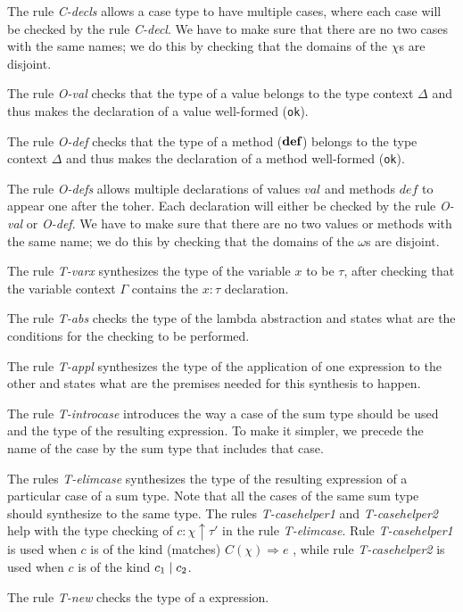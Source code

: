 The rule \textit{C-decls} allows a case type to have multiple cases, where each case will be checked by the rule \textit{C-decl}. We have to make sure that there are no two cases with the same names; we do this by checking that the domains of the $\chi$s are disjoint.

The rule \textit{O-val} checks that the type of a value belongs to the type context $\Delta$ and thus makes the declaration of a value well-formed (\texttt{ok}).

The rule \textit{O-def} checks that the type of a method ($\textbf{def}$) belongs to the type context $\Delta$ and thus makes the declaration of a method well-formed (\texttt{ok}).

The rule \textit{O-defs} allows multiple declarations of values $val$ and methods $def$ to appear one after the toher. Each declaration will either be checked by the rule \textit{O-val} or \textit{O-def}. We have to make sure that there are no two values or methods with the same name; we do this by checking that the domains of the $\omega$s are disjoint.

The rule \textit{T-varx} synthesizes the type of the variable $x$ to be $\tau$, after checking that the variable context $\Gamma$ contains the $x:\tau$ declaration. 

The rule \textit{T-abs} checks the type of the lambda abstraction and states what are the conditions for the checking to be performed.

The rule \textit{T-appl} synthesizes the type of the application of one expression to the other and states what are the premises needed for this synthesis to happen.

The rule \textit{T-introcase} introduces the way a case of the sum type should be used and the type of the resulting expression. To make it simpler, we precede the name of the case by the sum type that includes that case.

The rules \textit{T-elimcase} synthesizes the type of the resulting expression of a particular case of a sum type. Note that all the cases of the same sum type should synthesize to the same type. The rules  \textit{T-casehelper1} and \textit{T-casehelper2} help with the type checking of $c:\chi \uparrow \tau'$ in the rule \textit{T-elimcase}. Rule \textit{T-casehelper1} is used when $c$ is of the kind (matches) $C(\chi)\Rightarrow e$ , while rule \textit{T-casehelper2} is used when $c$ is of the kind $c_1 \mathrel{\mid} c_2$.

The rule \textit{T-new} checks the type of a  expression. 

